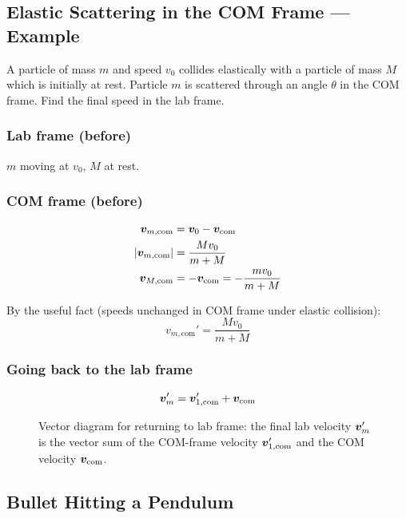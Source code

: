 \subsection{Elastic Scattering in the COM Frame — Example}

\begin{example}
A particle of mass $m$ and speed $v_0$ collides elastically with a particle of mass $M$ which is initially at rest. Particle $m$ is scattered through an angle $\theta$ in the COM frame. Find the final speed in the lab frame.

\subsubsection*{Lab frame (before)}
$m$ moving at $v_0$, $M$ at rest.

\subsubsection*{COM frame (before)}
\begin{align*}
    \bm{v}_{m,\text{com}} &= \bm{v}_0 - \bm{v}_\text{com} \\
    |\bm{v}_{m,\text{com}}| &= \frac{Mv_0}{m+M} \\
    \bm{v}_{M,\text{com}} &= -\bm{v}_\text{com} = -\frac{mv_0}{m+M}
\end{align*}

By the useful fact (speeds unchanged in COM frame under elastic collision):
\[
    v_{m,\text{com}}' = \frac{Mv_0}{m+M}
\]

\subsubsection*{Going back to the lab frame}
\[
    \bm{v}_m' = \bm{v}_{1,\text{com}}' + \bm{v}_\text{com}
\]

\begin{figure}[H]
\centering
\caption{Vector diagram for returning to lab frame: the final lab velocity $\bm{v}_m'$ is the vector sum of the COM-frame velocity $\bm{v}_{1,\text{com}}'$ and the COM velocity $\bm{v}_\text{com}$.}
\end{figure}
\end{example}

\subsection{Bullet Hitting a Pendulum}

